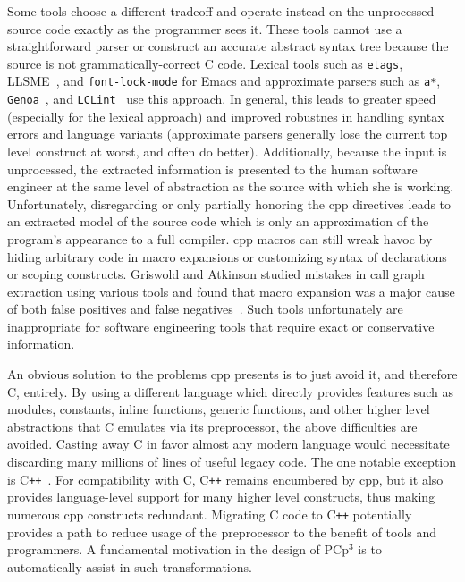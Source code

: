 \documentclass{article}
\newcommand{\pcp}{\mbox{\textsf{PCp}$^3$}}
\newcommand{\Cpp}{\mbox{\textsf{cpp}}}
\newcommand{\CPP}{\mbox{\textsf{C\texttt{++}}}}
\newcommand{\C}{\mbox{\textsf{C}}}
\begin{document}
Some tools choose a different tradeoff and operate instead on the
unprocessed source code exactly as the programmer sees it.  These tools
cannot use a straightforward parser or construct an accurate abstract
syntax tree because the source is not grammatically-correct \C{} code.
Lexical tools such as \texttt{etags}, LLSME~\cite{Murphy95}, and
\texttt{font-lock-mode} for Emacs and approximate parsers such as
\texttt{a*},
\texttt{Genoa}~\cite{Devanbu92}, and \texttt{LCLint}~\cite{LCLint}
use this approach.  In general, this leads to greater speed (especially
for the lexical approach) and improved robustnes in handling syntax errors and
language variants (approximate parsers generally lose the current top
level construct at worst, and often do better). Additionally, because
the input is unprocessed, the extracted information is presented to the
human software engineer at the same level of abstraction as the source
with which she is working.  Unfortunately, disregarding or only
partially honoring the \Cpp{} directives leads to an extracted model of
the source code which is only an approximation of the program's
appearance to a full compiler.  \Cpp{} macros can still wreak havoc by
hiding arbitrary code in macro expansions or customizing syntax of
declarations or scoping constructs.  Griswold and Atkinson studied
mistakes in call graph extraction using various tools and found that
macro expansion was a major cause of both false positives and false
negatives~\cite{Griswold96}.  Such tools unfortunately are inappropriate
for software engineering tools that require exact or conservative
information.

An obvious solution to the problems \Cpp{} presents is to just avoid it,
and therefore \C{}, entirely.  By using a different language which
directly provides features such as modules, constants, inline functions,
generic functions, and other higher level abstractions that \C{}
emulates via its preprocessor, the above difficulties are avoided.
Casting away \C{} in favor almost any modern language would necessitate
discarding many millions of lines of useful legacy code.  The one notable
exception is \CPP{}~\cite{CD2DraftStandard}. For compatibility with
\C{}, \CPP{} remains encumbered by \Cpp{}, but it also provides
language-level support for many higher level constructs, thus making
numerous \Cpp{} constructs redundant.
Migrating \C{} code to \CPP{} potentially provides a path to reduce
usage of the preprocessor to the benefit of tools and programmers.  A
fundamental motivation in the design of \pcp{} is to automatically assist
in such transformations.
\end{document}
